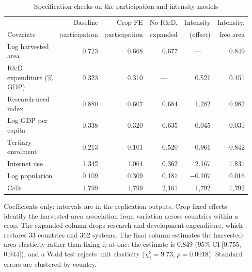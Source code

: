 \documentclass[ASNA,twocolumn]{USG}
\begin{document}
\begin{table}[!t]
\centering
\footnotesize
\caption{Specification checks on the participation and intensity models}
\label{tab:specchecks}
\begin{tabular*}{\textwidth}{@{\extracolsep\fill}l r r r r r@{}}
\toprule
& Baseline & Crop FE & No R\&D, & Intensity & Intensity, \\
Covariate & participation & participation & expanded & (offset) & free area \\
\midrule
Log harvested area & 0.723 & 0.668 & 0.677 & \multicolumn{1}{c}{---} & 0.849 \\
R\&D expenditure (\% GDP) & 0.323 & 0.310 & \multicolumn{1}{c}{---} & 0.521 & 0.451 \\
Research-need index & 0.880 & 0.607 & 0.684 & 1.282 & 0.982 \\
Log GDP per capita & 0.338 & 0.320 & 0.635 & $-$0.045 & 0.031 \\
Tertiary enrolment & 0.213 & 0.101 & 0.520 & $-$0.961 & $-$0.842 \\
Internet use & 1.342 & 1.064 & 0.362 & 2.167 & 1.831 \\
Log population & 0.109 & 0.309 & 0.187 & $-$0.107 & 0.016 \\
\midrule
Cells & 1,799 & 1,799 & 2,161 & 1,792 & 1,792 \\
\bottomrule
\end{tabular*}
\begin{tablenotes}
\item[] Coefficients only; intervals are in the replication outputs. Crop fixed effects identify the harvested-area association from variation across countries within a crop. The expanded column drops research and development expenditure, which restores 33 countries and 362 systems. The final column estimates the harvested-area elasticity rather than fixing it at one: the estimate is 0.849 (95\% CI [0.755, 0.944]), and a Wald test rejects unit elasticity ($\chi^2_1 = 9.73$, $p = 0.0018$). Standard errors are clustered by country.
\end{tablenotes}
\end{table}
\end{document}
